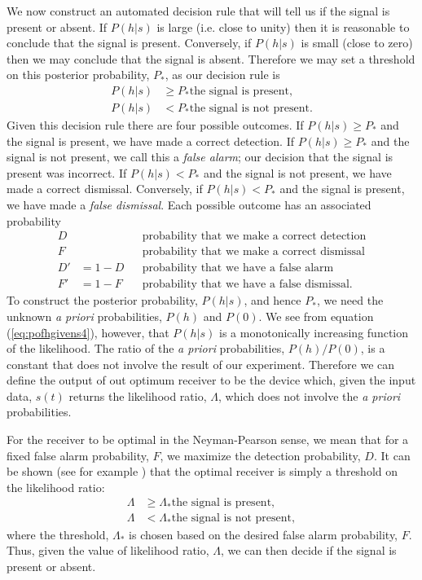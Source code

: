 We now construct an automated decision rule that will tell us if the signal is
present or absent.  If $P(h|s)$ is large (i.e.  close to unity) then it is
reasonable to conclude that the signal is present.  Conversely, if $P(h|s)$ is
small (close to zero) then we may conclude that the signal is absent.
Therefore we may set a threshold on this posterior probability, $P_\ast$, as
our decision rule is
\begin{equation}
\begin{split}
P(h|s) &\ge P_* \text{the signal is present}, \\
P(h|s) &< P_* \text{the signal is not present}.
\end{split}
\end{equation}
Given this decision rule there are four possible outcomes. If $P(h|s) \ge
P_*$ and the signal is present, we have made a correct detection. If $P(h|s)
\ge P_*$ and the signal is not present, we call this a \emph{false alarm}; our
decision that the signal is present was incorrect. If $P(h|s) < P_*$ and the
signal is not present, we have made a correct dismissal. Conversely, if
$P(h|s) < P_*$ and the signal is present, we have made a \emph{false
dismissal}. Each possible outcome has an associated probability
\begin{align}
D & &&\text{probability that we make a correct detection} \\
F & &&\text{probability that we make a correct dismissal} \\
D' &= 1 - D &&\text{probability that we have a false alarm} \\
F' &= 1 - F &&\text{probability that we have a false dismissal}.
\end{align}
To construct the posterior probability, $P(h|s)$, and hence $P_\ast$, we need
the unknown \emph{a priori} probabilities, $P(h)$ and $P(0)$. We see from
equation (\ref{eq:pofhgivens4}), however, that $P(h|s)$ is a monotonically
increasing function of the likelihood. The ratio of the \emph{a priori}
probabilities, $P(h)/P(0)$, is a constant that does not involve the result of
our experiment. Therefore we can define the output of out optimum receiver to be
the device which, given the input data, $s(t)$ returns the likelihood ratio,
$\Lambda$, which does not involve the \emph{a priori} probabilities. 

For the receiver to be optimal in the Neyman-Pearson sense, we mean that for a
fixed false alarm probability, $F$, we maximize the detection probability,
$D$. It can be shown (see for example \cite{XXX}) that the optimal
receiver is simply a threshold on the likelihood ratio:
\begin{equation}
\begin{split}
\Lambda &\ge \Lambda_\ast \text{the signal is present}, \\
\Lambda &< \Lambda_\ast \text{the signal is not present},
\end{split}
\end{equation}
where the threshold, $\Lambda_\ast$ is chosen based on the desired false alarm
probability, $F$. Thus, given the value of likelihood ratio, $\Lambda$, we
can then decide if the signal is present or absent. 

